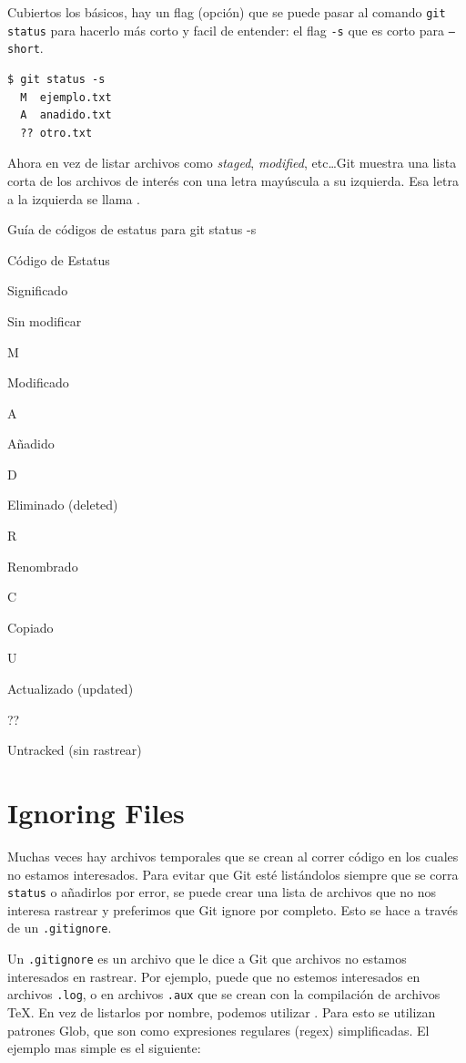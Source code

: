 \documentclass[spanish, 12pt, a4paper]{article}
\begin{document}
Cubiertos los básicos, hay un flag (opción) que se puede pasar al
comando \passthrough{\lstinline!git status!} para hacerlo más corto y
facil de entender: el flag \passthrough{\lstinline!-s!} que es corto
para \passthrough{\lstinline!–short!}.

\begin{lstlisting}
$ git status -s
  M  ejemplo.txt
  A  anadido.txt
  ?? otro.txt
\end{lstlisting}

Ahora en vez de listar archivos como \emph{staged}, \emph{modified},
etc\ldots Git muestra una lista corta de los archivos de interés con una
letra mayúscula a su izquierda. Esa letra a la izquierda se llama .

Guía de códigos de estatus para git status -s

Código de Estatus

Significado

Sin modificar

M

Modificado

A

Añadido

D

Eliminado (deleted)

R

Renombrado

C

Copiado

U

Actualizado (updated)

??

Untracked (sin rastrear)

\section{Ignoring Files}

Muchas veces hay archivos temporales que se crean al correr código en
los cuales no estamos interesados. Para evitar que Git esté listándolos
siempre que se corra \passthrough{\lstinline!status!} o añadirlos por
error, se puede crear una lista de archivos que no nos interesa rastrear
y preferimos que Git ignore por completo. Esto se hace a través de un
\passthrough{\lstinline!.gitignore!}.

Un \passthrough{\lstinline!.gitignore!} es un archivo que le dice a Git
que archivos no estamos interesados en rastrear. Por ejemplo, puede que
no estemos interesados en archivos \passthrough{\lstinline!.log!}, o en
archivos \passthrough{\lstinline!.aux!} que se crean con la compilación
de archivos TeX. En vez de listarlos por nombre, podemos utilizar . Para
esto se utilizan patrones Glob, que son como expresiones regulares
(regex) simplificadas. El ejemplo mas simple es el siguiente:
\end{document}
